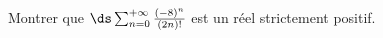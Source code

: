 \begin{enonce}
\begin{exercise}[ID={RMS124 E1267},subtitle={},tags={}, difficulty={0}]
Montrer que 
$\ds\sum_{n=0}^{+\infty} \frac{\left( -8 \right)^n}{\left( 2n \right)!}$
est un réel strictement positif.
\end{exercise}
\begin{solution}
\end{solution}
\end{enonce}

